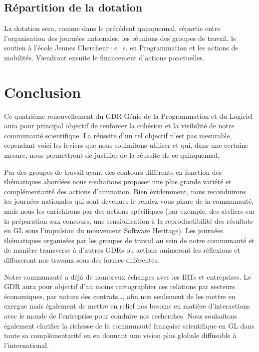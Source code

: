 \documentclass[11pt]{article}
\begin{document}
\subsection{Répartition de la dotation}

La dotation sera, comme dans le précédent quinquennal, répartie entre l'organisation des journées nationales, les réunions des groupes de travail, le soutien à l'école Jeunes Chercheur·e·s. en Programmation et les actions de mobilités. Viendront ensuite le financement d'actions ponctuelles.

\section{Conclusion}\label{conclusion}

Ce  quatrième renouvellement du GDR Génie de la Programmation et du Logiciel aura
pour principal objectif de renforcer la cohésion et la visibilité de notre communauté scientifique. La réussite d'un tel objectif n'est pas mesurable, cependant voici les leviers que nous souhaitons utiliser et qui, dans une certaine mesure, nous permettront de justifier de la réussite de ce quinquennal.

Par des groupes de travail ayant des contours différents en fonction des thématiques abordées nous souhaitons proposer une plus grande variété et complémentarité des actions d'animation. Bien évidemment, nous reconduirons les journées nationales qui sont devenues le rendez-vous phare de la communauté, mais nous les enrichirons par des actions spécifiques (par exemple, des ateliers sur la préparation aux concours, une sensibilisation à la reproductibilité des résultats en GL sous l'impulsion du mouvement Software Heritage). Les journées thématiques organisées par les groupes de travail au sein de notre communauté et de manière transverse à d'autres GDRs ou actions animeront les réflexions et diffuseront nos travaux sous des formes différentes.


Notre communauté a déjà de nombreux échanges avec les IRTs et entreprises. Le GDR aura pour objectif d'au moins cartographier ces relations par secteurs économiques, par nature des contrats\ldots, afin non seulement de les mettre en exergue mais également de mettre en relief nos besoins en matière d'interactions avec le monde de l'entreprise pour conduire nos recherches.
Nous souhaitons également clarifier la richesse de la communauté française scientifique en GL dans toute sa complémentarité en en donnant une vision plus globale diffusable à l'international.
\end{document}
